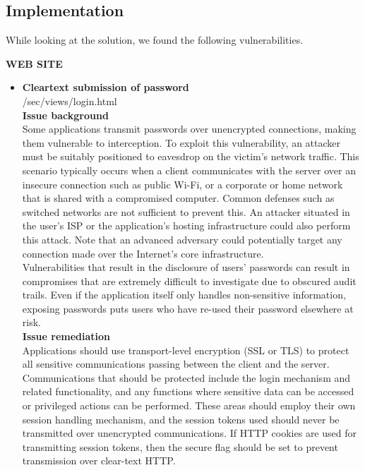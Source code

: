 \subsection{Implementation}

While looking at the solution, we found the following vulnerabilities. \\

\begin{center}
\textbf{WEB SITE}
\end{center}
\begin{itemize}  
\item \textbf{Cleartext submission of password} \\
/sec/views/login.html \\

\textbf{Issue background}\\
Some applications transmit passwords over unencrypted connections, making them vulnerable to interception. To exploit this vulnerability, an attacker must be suitably positioned to eavesdrop on the victim's network traffic. This scenario typically occurs when a client communicates with the server over an insecure connection such as public Wi-Fi, or a corporate or home network that is shared with a compromised computer. Common defenses such as switched networks are not sufficient to prevent this. An attacker situated in the user's ISP or the application's hosting infrastructure could also perform this attack. Note that an advanced adversary could potentially target any connection made over the Internet's core infrastructure.\\

Vulnerabilities that result in the disclosure of users' passwords can result in compromises that are extremely difficult to investigate due to obscured audit trails. Even if the application itself only handles non-sensitive information, exposing passwords puts users who have re-used their password elsewhere at risk.\\

\textbf{Issue remediation}\\
Applications should use transport-level encryption (SSL or TLS) to protect all sensitive communications passing between the client and the server. Communications that should be protected include the login mechanism and related functionality, and any functions where sensitive data can be accessed or privileged actions can be performed. These areas should employ their own session handling mechanism, and the session tokens used should never be transmitted over unencrypted communications. If HTTP cookies are used for transmitting session tokens, then the secure flag should be set to prevent transmission over clear-text HTTP.


\end{itemize}
